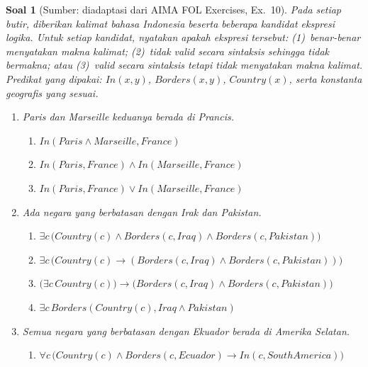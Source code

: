 \documentclass[12pt,a4paper]{article}
\theoremstyle{soaljarak}
\newtheorem{soal}{Soal}
\begin{document}
\begin{soal}[\normalfont Sumber: diadaptasi dari AIMA FOL Exercises, Ex.~10]
  Pada setiap butir, diberikan kalimat bahasa Indonesia beserta beberapa kandidat ekspresi logika.
  Untuk setiap kandidat, nyatakan apakah ekspresi tersebut:
  (1)~benar-benar menyatakan makna kalimat;
  (2)~tidak valid secara sintaksis sehingga tidak bermakna; atau
  (3)~valid secara sintaksis tetapi tidak menyatakan makna kalimat.
  Predikat yang dipakai: \(\mathit{In}(x,y)\), \(\mathit{Borders}(x,y)\), \(\mathit{Country}(x)\), serta konstanta geografis yang sesuai.
  \begin{enumerate}
    \item Paris dan Marseille keduanya berada di Prancis.
    \begin{enumerate}
      \item \(\mathit{In}(\mathit{Paris} \wedge \mathit{Marseille}, \mathit{France})\)
      \item \(\mathit{In}(\mathit{Paris},\mathit{France}) \wedge \mathit{In}(\mathit{Marseille},\mathit{France})\)
      \item \(\mathit{In}(\mathit{Paris},\mathit{France}) \vee \mathit{In}(\mathit{Marseille},\mathit{France})\)
    \end{enumerate}
    \item Ada negara yang berbatasan dengan Irak dan Pakistan.
    \begin{enumerate}
      \item \(\exists c\,\bigl(\mathit{Country}(c) \wedge \mathit{Borders}(c,\mathit{Iraq}) \wedge \mathit{Borders}(c,\mathit{Pakistan})\bigr)\)
      \item \(\exists c\,\bigl(\mathit{Country}(c) \rightarrow (\mathit{Borders}(c,\mathit{Iraq}) \wedge \mathit{Borders}(c,\mathit{Pakistan}))\bigr)\)
      \item \(\bigl(\exists c\,\mathit{Country}(c)\bigr) \rightarrow \bigl(\mathit{Borders}(c,\mathit{Iraq}) \wedge \mathit{Borders}(c,\mathit{Pakistan})\bigr)\)
      \item \(\exists c\,\mathit{Borders}(\mathit{Country}(c), \mathit{Iraq} \wedge \mathit{Pakistan})\)
    \end{enumerate}
    \item Semua negara yang berbatasan dengan Ekuador berada di Amerika Selatan.
    \begin{enumerate}
      \item \(\forall c\,\bigl(\mathit{Country}(c) \wedge \mathit{Borders}(c,\mathit{Ecuador}) \rightarrow \mathit{In}(c,\mathit{SouthAmerica})\bigr)\)

\end{enumerate}
\end{enumerate}
\end{soal}
\end{document}
